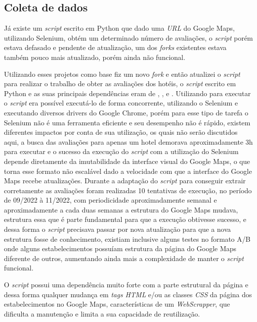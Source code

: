\subsection{Coleta de dados}
\label{cap:metodologia:sec:conjunto_dados:sec:coleta_review}

Já existe um \emph{script} escrito em Python \cite{gaspa93scrapper2023} que dado uma \emph{URL} do Google Maps, utilizando Selenium, obtém um determinado número de avaliações, o \emph{script} porém estava defasado e pendente de atualização, um dos \emph{forks} existentes  estava também pouco mais atualizado, porém ainda não funcional.


Utilizando esses projetos como base fiz um novo \emph{fork} e então atualizei o \emph{script} para realizar o trabalho de obter as avaliações dos hotéis, o \emph{script} escrito em Python e as suas principais dependências eram de \cite{selenium2023}, ,  e . Utilizando  para executar o \emph{script} era possível executá-lo de forma concorrente, utilizando o Selenium e executando diversos drivers do Google Chrome, porém para esse tipo de tarefa o Selenium não é uma ferramenta eficiente e seu desempenho não é rápido, existem diferentes impactos por conta de sua utilização, os quais não serão discutidos aqui, a busca das avaliações para apenas um hotel demorava aproximadamente 3h para executar e o sucesso da execução do \emph{script} com a utilização do Selenium depende diretamente da imutabilidade da interface visual do Google Maps, o que torna esse formato não escalável dado a velocidade com que a interface do Google Maps recebe atualizações. Durante a adaptação do \emph{script} para conseguir extrair corretamente as avaliações foram realizadas 10 tentativas de execução, no período de 09/2022 à 11/2022, com periodicidade aproximadamente semanal e aproximadamente a cada duas semanas a estrutura do Google Maps mudava, estrutura essa que é parte fundamental para que a execução obtivesse sucesso, e dessa forma o \emph{script} precisava passar por nova atualização para que a nova estrutura fosse de conhecimento, existiam inclusive alguns testes no formato A/B onde alguns estabelecimentos possuíam estrutura da página do Google Maps diferente de outros, aumentando ainda mais a complexidade de manter o \emph{script} funcional.

O \emph{script} possui uma dependência muito forte com a parte estrutural da página e dessa forma qualquer mudança em \emph{tags HTML} e/ou as classes \emph{CSS} da página dos estabelecimentos no Google Maps, características de um \emph{WebScrapper}, que dificulta a manutenção e limita a sua capacidade de reutilização.


